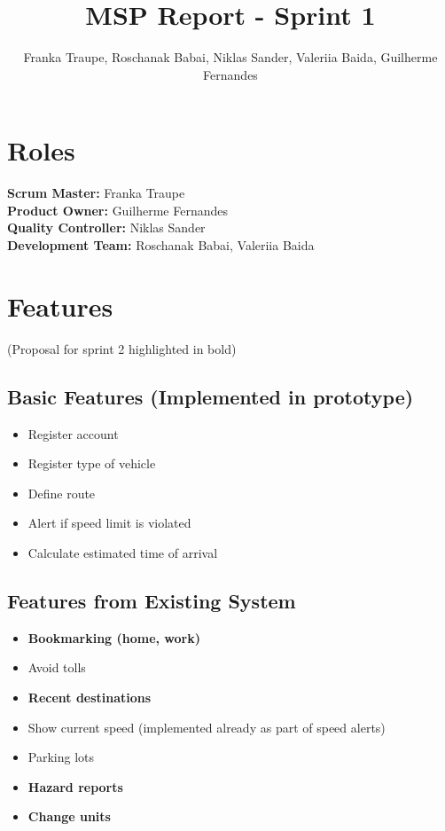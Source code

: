 \documentclass{article}
\title{MSP Report - Sprint 1}
\author{Franka Traupe, Roschanak Babai, Niklas Sander, Valeriia Baida, Guilherme Fernandes}
\date{}
\begin{document}
\maketitle

\section*{Roles}
\textbf{Scrum Master:} Franka Traupe\\
\textbf{Product Owner:} Guilherme Fernandes\\
\textbf{Quality Controller:} Niklas Sander\\
\textbf{Development Team:} Roschanak Babai, Valeriia Baida

\section*{Features}
(Proposal for sprint 2 highlighted in bold)

\subsection*{Basic Features (Implemented in prototype)}
\begin{itemize}
    \item Register account
    \item Register type of vehicle
    \item Define route
    \item Alert if speed limit is violated
    \item Calculate estimated time of arrival
\end{itemize}

\subsection*{Features from Existing System}
\begin{itemize}
    \item \textbf{Bookmarking (home, work)}
    \item Avoid tolls
    \item \textbf{Recent destinations}
    \item Show current speed (implemented already as part of speed alerts)
    \item Parking lots
    \item \textbf{Hazard reports}
    \item \textbf{Change units}
\end{itemize}
\end{document}
